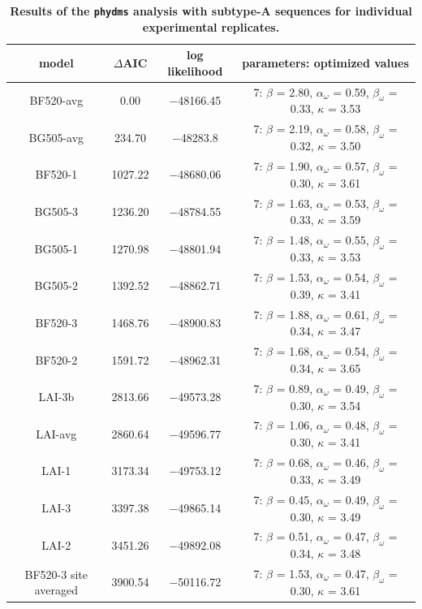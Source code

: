 \documentclass[9pt,lineno]{elife}
\begin{document}
\begin{table}
\centering
\caption[Results of the \texttt{phydms} analysis with subtype-A sequences for individual experimental replicates.]{
{\bf Results of the \texttt{phydms} analysis with subtype-A sequences for individual experimental replicates.}}
{\footnotesize
\begin{tabular}{cccc}
model & $\Delta$AIC & log likelihood & parameters: optimized values \\ 
\hline
BF520-avg & 0.00 & $-$48166.45 & 7: $\beta$ = 2.80, $\alpha_\omega$ = 0.59, $\beta_\omega$ = 0.33, $\kappa$ = 3.53\\
BG505-avg & 234.70 & $-$48283.8 & 7: $\beta$ = 2.19, $\alpha_\omega$ = 0.58, $\beta_\omega$ = 0.32, $\kappa$ = 3.50\\
BF520-1 & 1027.22 & $-$48680.06 & 7: $\beta$ = 1.90, $\alpha_\omega$ = 0.57, $\beta_\omega$ = 0.30, $\kappa$ = 3.61\\
BG505-3 & 1236.20 & $-$48784.55 & 7: $\beta$ = 1.63, $\alpha_\omega$ = 0.53, $\beta_\omega$ = 0.33, $\kappa$ = 3.59\\
BG505-1 & 1270.98 & $-$48801.94 & 7: $\beta$ = 1.48, $\alpha_\omega$ = 0.55, $\beta_\omega$ = 0.33, $\kappa$ = 3.53\\
BG505-2 & 1392.52 & $-$48862.71 & 7: $\beta$ = 1.53, $\alpha_\omega$ = 0.54, $\beta_\omega$ = 0.39, $\kappa$ = 3.41\\
BF520-3 & 1468.76 & $-$48900.83 & 7: $\beta$ = 1.88, $\alpha_\omega$ = 0.61, $\beta_\omega$ = 0.34, $\kappa$ = 3.47\\
BF520-2 & 1591.72 & $-$48962.31 & 7: $\beta$ = 1.68, $\alpha_\omega$ = 0.54, $\beta_\omega$ = 0.34, $\kappa$ = 3.65\\
LAI-3b & 2813.66 & $-$49573.28 & 7: $\beta$ = 0.89, $\alpha_\omega$ = 0.49, $\beta_\omega$ = 0.30, $\kappa$ = 3.54\\
LAI-avg & 2860.64 & $-$49596.77 & 7: $\beta$ = 1.06, $\alpha_\omega$ = 0.48, $\beta_\omega$ = 0.30, $\kappa$ = 3.41\\
LAI-1 & 3173.34 & $-$49753.12 & 7: $\beta$ = 0.68, $\alpha_\omega$ = 0.46, $\beta_\omega$ = 0.33, $\kappa$ = 3.49\\
LAI-3 & 3397.38 & $-$49865.14 & 7: $\beta$ = 0.45, $\alpha_\omega$ = 0.49, $\beta_\omega$ = 0.30, $\kappa$ = 3.49\\
LAI-2 & 3451.26 & $-$49892.08 & 7: $\beta$ = 0.51, $\alpha_\omega$ = 0.47, $\beta_\omega$ = 0.34, $\kappa$ = 3.48\\
BF520-3 site averaged & 3900.54 & $-$50116.72 & 7: $\beta$ = 1.53, $\alpha_\omega$ = 0.47, $\beta_\omega$ = 0.30, $\kappa$ = 3.61\\

\end{tabular}}
\end{table}
\end{document}
